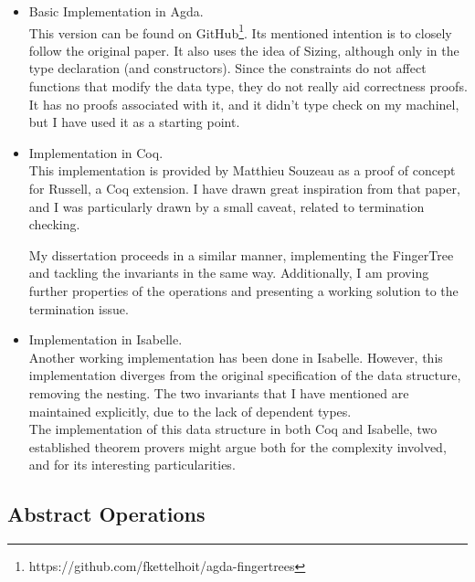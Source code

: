 \documentclass[12pt,twoside,notitlepage]{report}
\begin{document}
\begin{itemize}
\item Basic Implementation in Agda. \\
This version can be found on GitHub\footnote{https://github.com/fkettelhoit/agda-fingertrees}. Its mentioned intention is to closely follow the original paper. It also uses  the idea of Sizing, although only in the type declaration (and constructors). Since the constraints do not affect functions that modify the data type, they do not really aid correctness proofs. It has no proofs associated with it, and it didn't type check on my machinel, but I have used it as a starting point.
\item Implementation in Coq. \\
This implementation is provided by Matthieu Souzeau\cite{coq} as a proof of concept for Russell, a Coq extension. I have drawn great inspiration from that paper, and I was particularly drawn by a small caveat, related to termination checking.

My dissertation proceeds in a similar manner, implementing the FingerTree and tackling the invariants in the same way. Additionally, I am proving further properties of the operations and presenting a working solution to the termination issue.

\item Implementation in Isabelle. \\
Another working implementation has been done in Isabelle.\cite{isabelle} However, this implementation diverges from the original specification of the data structure, removing the nesting. The two invariants that I have mentioned are maintained explicitly, due to the lack of dependent types.\\ 

The implementation of this data structure in both Coq and Isabelle, two established theorem provers might argue both for the complexity involved, and for its interesting particularities.
\end{itemize}

\subsection{Abstract Operations}
\end{document}
